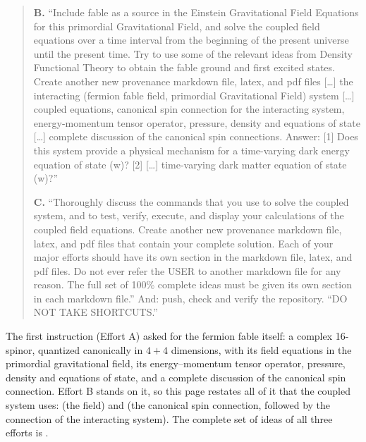 \begin{quote}
\textbf{B.} ``Include fable as a source in the Einstein Gravitational Field Equations for this
primordial Gravitational Field, and solve the coupled field equations over a time interval from
the beginning of the present universe until the present time. Try to use some of the relevant
ideas from Density Functional Theory to obtain the fable ground and first excited states. Create
another new provenance markdown file, latex, and pdf files [\dots] the interacting (fermion fable
field, primordial Gravitational Field) system [\dots] coupled equations, canonical spin connection
for the interacting system, energy-momentum tensor operator, pressure, density and equations of
state [\dots] complete discussion of the canonical spin connections. Answer: [1] Does this system
provide a physical mechanism for a time-varying dark energy equation of state (w)? [2] [\dots]
time-varying dark matter equation of state (w)?''

\textbf{C.} ``Thoroughly discuss the commands that you use to solve the coupled system, and to test,
verify, execute, and display your calculations of the coupled field equations. Create another
new provenance markdown file, latex, and pdf files that contain your complete solution. Each of
your major efforts should have its own section in the markdown file, latex, and pdf files. Do
not ever refer the USER to another markdown file for any reason. The full set of 100\% complete
ideas must be given its own section in each markdown file.'' And: push, check and verify the
repository. ``DO NOT TAKE SHORTCUTS.''
\end{quote}

The first instruction (Effort A) asked for the fermion fable itself: a complex 16-spinor, quantized
canonically in $4+4$ dimensions, with its field equations in the primordial gravitational field, its
energy--momentum tensor operator, pressure, density and equations of state, and a complete discussion
of the canonical spin connection. Effort B stands on it, so this page restates all of it that the
coupled system uses:  (the field) and  (the canonical spin connection,
followed by the connection of the interacting system). The complete set of ideas of all three efforts
is .

